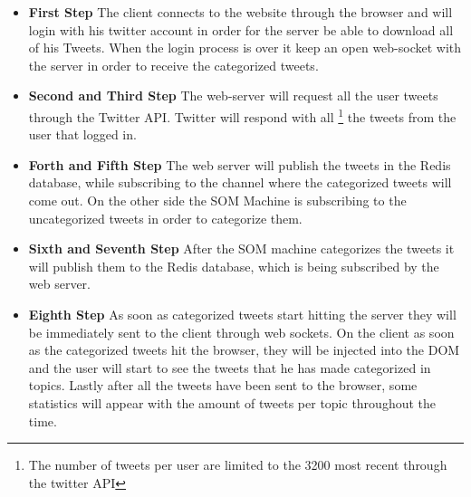 \begin{itemize}
  \item \textbf{First Step} The client connects to the website through the browser and will login with his twitter account in order for the server be able to download all of his Tweets. When the login process is over it keep an open web-socket with the server in order to receive the categorized tweets.
  \item \textbf{Second and Third Step} The web-server will request all the user tweets through the Twitter API. Twitter will respond with all \footnote{The number of tweets per user are limited to the 3200 most recent through the twitter API} the tweets from the user that logged in.
  \item \textbf{Forth and Fifth Step} The web server will publish the tweets in the Redis database, while subscribing to the channel where the categorized tweets will come out. On the other side the SOM Machine is subscribing to the uncategorized tweets in order to categorize them.
  \item \textbf{Sixth and Seventh Step} After the SOM machine categorizes the tweets it will publish them to the Redis database, which is being subscribed by the web server.
  \item \textbf{Eighth Step} As soon as categorized tweets start hitting the server they will be immediately sent to the client through web sockets. On the client as soon as the categorized tweets hit the browser, they will be injected into the DOM and the user will start to see the tweets that he has made categorized in topics. Lastly after all the tweets have been sent to the browser, some statistics will appear with the amount of tweets per topic throughout the time.
\end{itemize}

 